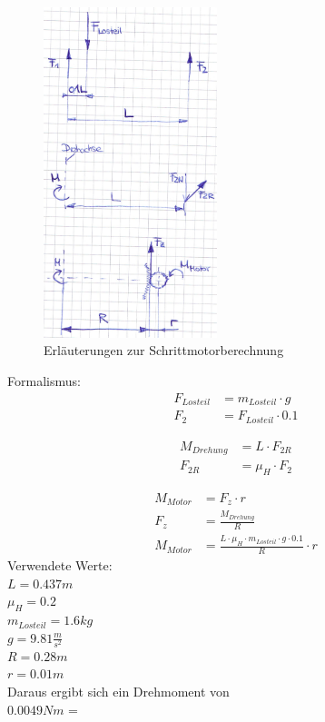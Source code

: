 \begin{figure}
	\centering
	\includegraphics[width=0.45\textwidth]{Enddokumentation/Anhang/Bilder/NotizBerechnungDrehmomentStepper.jpg}
	\caption{Erläuterungen zur Schrittmotorberechnung}	
\end{figure}
Formalismus:
\begin{align}
    F_{Losteil} &= m_{Losteil} \cdot g\\
    F_2 &= F_{Losteil} \cdot 0.1
\end{align}

\begin{align}
    M_{Drehung} &= L \cdot F_{2R}\\
    F_{2R} &= \mu_H \cdot F_2
\end{align}

\begin{align}
    M_{Motor} &= F_z \cdot r\\
    F_z &= \frac{M_{Drehung}}{R}\\
    M_{Motor} &=\frac{L \cdot \mu_H \cdot m_{Losteil} \cdot g \cdot 0.1}{R} \cdot r
\end{align}
Verwendete Werte:\\
$L = 0.437m$\\
$\mu_H = 0.2$\\
$m_{Losteil} = 1.6 kg$\\
$g = 9.81 \frac{m}{s^2}$\\
$R = 0.28 m$\\
$r = 0.01 m$\\
Daraus ergibt sich ein Drehmoment von \\
$0.0049 Nm$ = \\

